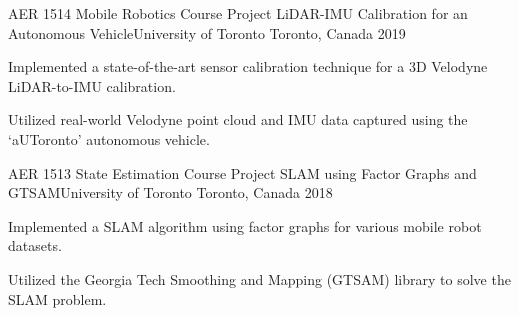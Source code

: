 

\begin{cventries}

  \cventry
    {AER 1514 Mobile Robotics Course Project} %
    {LiDAR-IMU Calibration for an Autonomous Vehicle{\enskip\cdotp\enskip}University of Toronto} %
    {Toronto, Canada} %
    {2019} %
    {
      \begin{cvitems} %
        \item {Implemented a state-of-the-art sensor calibration technique for a 3D Velodyne LiDAR-to-IMU calibration.}
        \item {Utilized real-world Velodyne point cloud and IMU data captured using the `aUToronto' autonomous vehicle.}
      \end{cvitems}
    }
    
  \cventry
    {AER 1513 State Estimation Course Project} %
    {SLAM using Factor Graphs and GTSAM{\enskip\cdotp\enskip}University of Toronto} %
    {Toronto, Canada} %
    {2018} %
    {
      \begin{cvitems} %
        \item {Implemented a SLAM algorithm using factor graphs for various mobile robot datasets.}
        \item {Utilized the Georgia Tech Smoothing and Mapping (GTSAM) library to solve the SLAM problem.}
      \end{cvitems}
    }

\end{cventries}

